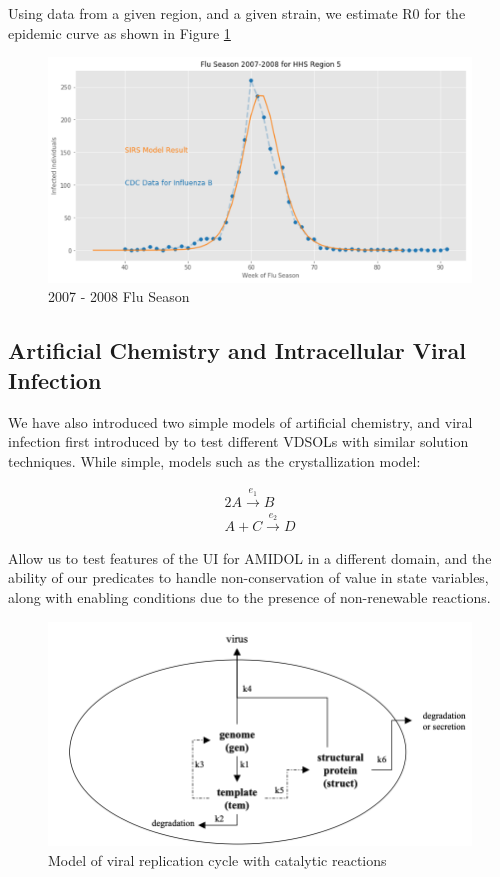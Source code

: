 \documentclass[11pt]{article}
\newcommand{\amidol}{\textsc{AMIDOL}}
\begin{document}
Using data from a given region, and a given strain, we estimate R0 for the epidemic curve as shown in Figure \ref{Fig:R0}

\begin{figure}
\includegraphics[width=\textwidth]{figs/2007-2008-SIRS.pdf}
\caption{2007 - 2008 Flu Season}
\label{Fig:R0}
\end{figure}

\subsection{Artificial Chemistry and Intracellular Viral Infection}

We have also introduced two simple models of artificial chemistry, and viral infection first introduced by \cite{srivastava2002stochastic,haseltine2002approximate} to test different VDSOLs with similar solution techniques.  While simple, models such as the crystallization model:

\begin{eqnarray}
  2A \overset{e_1}{\rightarrow} B\\
  A + C \overset{e_2}{\rightarrow} D
\end{eqnarray}

Allow us to test features of the UI for \amidol{} in a different domain, and the ability of our predicates to handle non-conservation of value in state variables, along with enabling conditions due to the presence of non-renewable reactions.

\begin{figure}
\includegraphics[width=\textwidth]{figs/ViralRep-Crop.png}
\caption{Model of viral replication cycle with catalytic reactions}
\label{Fig:ViralRep}
\end{figure}
\end{document}
